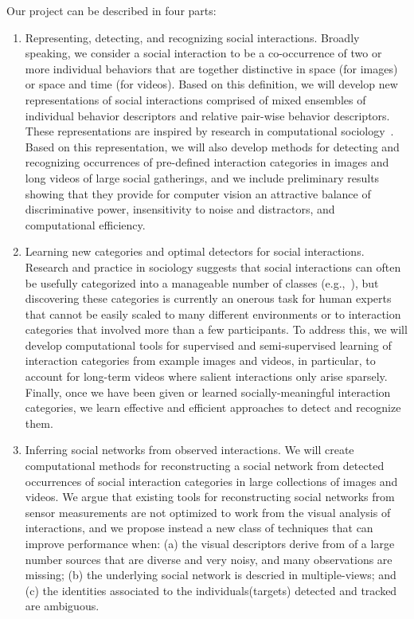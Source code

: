 Our project can be described in four parts:
\begin{enumerate}

\item Representing, detecting, and recognizing social interactions. Broadly speaking, we consider a social interaction to be a co-occurrence of two or more individual behaviors that are together distinctive in space (for images) or space and time (for videos). Based on this definition, we will develop new representations of social interactions comprised of mixed ensembles of individual behavior descriptors and relative pair-wise behavior descriptors. These representations are inspired by research in computational sociology~\cite{Lazer2009}. Based on this representation, we will also develop methods for detecting and recognizing occurrences of pre-defined interaction categories in images and long videos of large social gatherings, and we include preliminary results showing that they provide for computer vision an attractive balance of discriminative power, insensitivity to noise and distractors, and computational efficiency.


\item Learning new categories and optimal detectors for social interactions. Research and practice in sociology suggests that social interactions can often be usefully categorized into a manageable number of classes (e.g.,~\cite{Scherr2009}), but discovering these categories is currently an onerous task for human experts that cannot be easily scaled to many different environments or to interaction categories that involved more than a few participants. To address this, we will develop computational tools for supervised and semi-supervised learning of interaction categories from example images and videos, in particular, to account for long-term videos where salient interactions only arise sparsely. Finally, once we have been given or learned socially-meaningful interaction categories, we learn effective and efficient approaches to detect and recognize them.


\item Inferring social networks from observed interactions. We will create computational methods for reconstructing a social network from detected occurrences of social interaction categories in large collections of images and videos. We argue that existing tools for reconstructing social networks from sensor measurements are not optimized to work from the visual analysis of interactions, and we propose instead a new class of techniques that can improve performance when: (a) the visual descriptors derive from of a large number sources that are diverse and very noisy, and many observations are missing; (b) the underlying social network is descried in multiple-views; and (c) the identities associated to the individuals(targets) detected and tracked are ambiguous. 


\end{enumerate}
